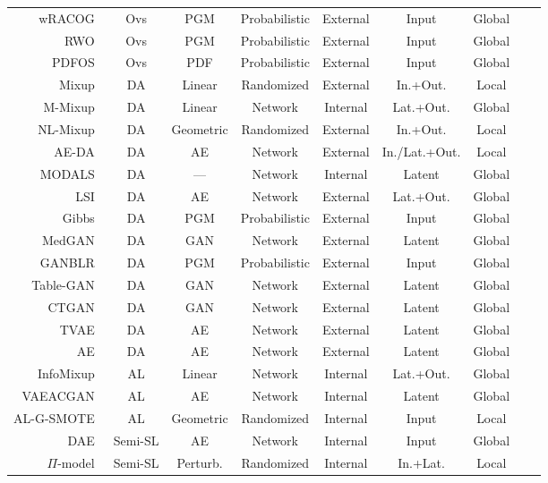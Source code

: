 \begin{longtable}{rcccccccc}
    wRACOG~\cite{das2014racog} & Ovs & PGM & Probabilistic & External & Input & Global \\
    RWO~\cite{zhang2014rwo} & Ovs & PGM & Probabilistic & External & Input & Global \\
    PDFOS~\cite{gao2014pdfos} & Ovs & PDF & Probabilistic & External & Input & Global \\
    Mixup~\cite{zhang2018mixup} & DA & Linear & Randomized & External & In.+Out. & Local \\
    M-Mixup~\cite{verma2019manifold} & DA & Linear & Network & Internal & Lat.+Out. & Global \\
    NL-Mixup~\cite{guo2020nonlinear} & DA & Geometric & Randomized & External & In.+Out. & Local \\
    AE-DA~\cite{feng2020autuencoder} & DA & AE & Network & External & In./Lat.+Out. & Local \\
    MODALS~\cite{cheung2020modals} & DA & --- & Network & Internal & Latent & Global \\
    LSI~\cite{liu2018data} & DA & AE & Network & External & Lat.+Out. & Global \\
    Gibbs~\cite{fakoor2020fast} & DA & PGM & Probabilistic & External & Input & Global \\
    MedGAN~\cite{armanious2020medgan} & DA & GAN & Network & External & Latent & Global \\
    GANBLR~\cite{zhang2021ganblr} & DA & PGM & Probabilistic & External & Input & Global \\
    Table-GAN~\cite{park2018data} & DA & GAN & Network & External & Latent & Global \\
    CTGAN~\cite{xu2019modeling} & DA & GAN & Network & External & Latent & Global \\
    TVAE~\cite{xu2019modeling} & DA & AE & Network & External & Latent & Global \\
    AE~\cite{delgado2021deep} & DA & AE & Network & External & Latent & Global \\
    InfoMixup~\cite{Kim2021} & AL & Linear & Network & Internal & Lat.+Out. & Global \\
    VAEACGAN~\cite{tran2019bayesian} & AL & AE & Network & Internal & Latent & Global\\
    AL-G-SMOTE~\cite{Fonseca2021al} & AL & Geometric & Randomized & Internal & Input & Local\\
    DAE~\cite{rasmus2015semi} & Semi-SL & AE & Network & Internal & Input & Global \\ 
    $\Pi$-model~\cite{samuli2017temporal} & Semi-SL & Perturb. & Randomized & Internal & In.+Lat. & Local \\

\end{longtable}
